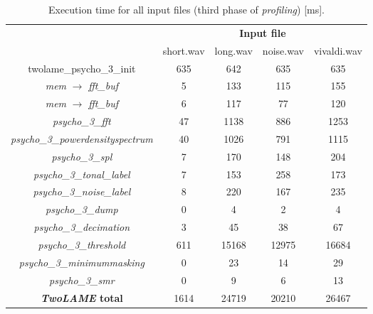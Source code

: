 \begin{table}[H]
    \centering
    \begin{tabular}{|c|c|c|c|c|}
    \cline{2-5}
    \multicolumn{1}{c|}{}  & \multicolumn{4}{c|}{\textbf{Input file}} \\
    \cline{2-5}
    \multicolumn{1}{c|}{} & short.wav & long.wav & noise.wav & vivaldi.wav \\
    \hline
    \multicolumn{1}{|c|}{twolame\_psycho\_3\_init}  & 635 & 642 & 635 & 635 \\ 
   \hline
    \multicolumn{1}{|c|}{\textit{mem} $\rightarrow$ \textit{fft\_buf}} & 5 & 133 & 115 & 155 \\ 
    \hline
     \multicolumn{1}{|c|}{\textit{mem} $\rightarrow$ \textit{fft\_buf}} &  6 &  117& 77 &  120 \\ 
    \hline
     \multicolumn{1}{|c|}{\textit{psycho\_3\_fft}} & 47 & 1138 & 886 &  1253  \\ 
    \hline
     \multicolumn{1}{|c|}{\textit{psycho\_3\_powerdensityspectrum}} & 40  & 1026 & 791 &  1115  \\ 
    \hline
     \multicolumn{1}{|c|}{\textit{psycho\_3\_spl}} &  7 & 170 & 148 & 204  \\ 
    \hline
      \multicolumn{1}{|c|}{\textit{psycho\_3\_tonal\_label}} &  7 & 153 & 258 & 173  \\ 
     \hline
     \multicolumn{1}{|c|}{\textit{psycho\_3\_noise\_label}} & 8 & 220 & 167 & 235  \\ 
    \hline
     \multicolumn{1}{|c|}{\textit{psycho\_3\_dump}} &  0 & 4 & 2 & 4  \\ 
    \hline
     \multicolumn{1}{|c|}{\textit{psycho\_3\_decimation}} & 3 & 45 & 38 & 67   \\
    \hline
     \multicolumn{1}{|c|}{\textit{psycho\_3\_threshold}} & 611 & 15168  & 12975 &  16684 \\
    \hline
     \multicolumn{1}{|c|}{\textit{psycho\_3\_minimummasking}} & 0 & 23 & 14 & 29  \\ 
    \hline
     \multicolumn{1}{|c|}{\textit{psycho\_3\_smr}} & 0 & 9 & 6 & 13  \\ 
    \hline
    \multicolumn{1}{|c|}{\textbf{\textit{TwoLAME} total}}  & 1614 & 24719 & 20210 & 26467 \\ 
    \hline
    \end{tabular}
    \caption{Execution time for all input files (third phase of \textit{profiling}) [ms].}
    \label{profiling3}
\end{table}

